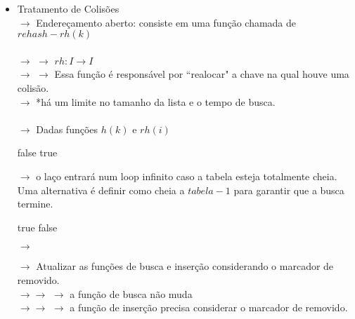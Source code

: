 \documentclass[a4paper, 12pt]{article}
\begin{document}
\begin{itemize}
\item Tratamento de Colisões\\
$\rightarrow$ Endereçamento aberto: consiste em uma função chamada de $rehash - rh(k)$\\
\\
\color{white}
$\rightarrow$
\color{black}
$\rightarrow$ $rh: I \rightarrow I$\\
\color{white}
$\rightarrow$
\color{black}
$\rightarrow$ Essa função é responsável por ``realocar" a chave na qual houve uma colisão.\\
\color{white}
$\rightarrow$
\color{black}
*há um limite no tamanho da lista e o tempo de busca.\\
\\
$\rightarrow$ Dadas funções $h(k)$ e $rh(i)$
\begin{algorithmic}[1]
	\EndWhile
{}
	\State \Return false
\Else 
	\State \Return true
\EndIf
\end{algorithmic}
\color{white}
$\rightarrow$
\color{black}
o laço entrará num loop infinito caso a tabela esteja totalmente cheia. Uma alternativa é definir como cheia a $tabela-1$ para garantir que a busca termine.\\

\begin{algorithmic}[1]
	\EndWhile
{}
	\State \Return true
\Else 
	\State \Return false
\EndIf
\end{algorithmic}

\color{white}
$\rightarrow$
\color{black}

\begin{algorithmic}[1]
	\EndWhile
{}
\EndIf
\end{algorithmic}

\color{white}
$\rightarrow$
\color{black}
Atualizar as funções de busca e inserção considerando o marcador de removido.\\
\color{white}
$\rightarrow \rightarrow$
\color{black}
$\rightarrow$ a função de busca não muda\\
\color{white}
$\rightarrow \rightarrow$
\color{black}
$\rightarrow$ a função de inserção precisa considerar o marcador de removido.\\


\end{itemize}
\end{document}
